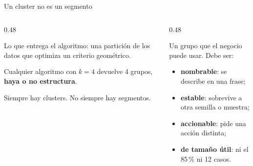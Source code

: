 \documentclass[aspectratio=169,12pt]{beamer}
\begin{document}
\begin{frame}{Un cluster no es un segmento}
  \begin{columns}[T]
    \begin{column}{0.48\textwidth}
      \begin{defbox}[Cluster]
        \small Lo que entrega el algoritmo: una partición de los datos que optimiza un criterio geométrico.
      \end{defbox}
      \small Cualquier algoritmo con $k=4$ devuelve 4 grupos, \textbf{haya o no estructura}.
      \begin{rulebox}
        \small Siempre hay clusters. No siempre hay segmentos.
      \end{rulebox}
    \end{column}
    \begin{column}{0.48\textwidth}
      \begin{defbox}[Segmento]
        \footnotesize Un grupo que el negocio puede usar. Debe ser:
        \begin{itemize}
          \item \textbf{nombrable}: se describe en una frase;
          \item \textbf{estable}: sobrevive a otra semilla o muestra;
          \item \textbf{accionable}: pide una acción distinta;
          \item \textbf{de tamaño útil}: ni el 85\,\% ni 12 casos.
        \end{itemize}
      \end{defbox}
    \end{column}
  \end{columns}
\end{frame}
\end{document}
